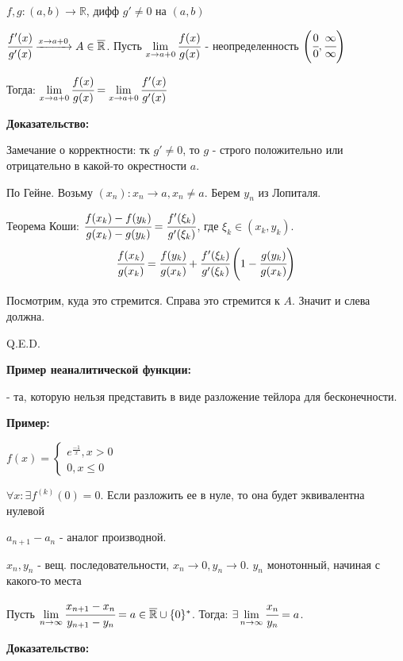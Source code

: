 
$f,g: (a,b) \rightarrow\mathbb{R}$, дифф $g'\neq 0$ на $(a,b)$

$\cfrac{f'(x)}{g'(x)} \xrightarrow{x \rightarrow a+0} A \in \overline{\mathbb{R}}$. Пусть $\lim\limits_{x\rightarrow a+0}\cfrac{f(x)}{g(x)}$ - неопределенность $\left(\cfrac{0}{0}, \cfrac{\infty}{\infty}\right)$

Тогда: $\lim\limits_{x\rightarrow a+0}\cfrac{f(x)}{g(x)}=\lim\limits_{x\rightarrow a+0} \cfrac{f'(x)}{g'(x)}$

\textbf{Доказательство:} 

Замечание о корректности: тк $g'\neq 0$, то $g$ - строго положительно или отрицательно в какой-то окрестности $a$.

По Гейне. Возьму $(x_n): x_n \rightarrow a,x_n\neq a$. Берем $y_n$ из Лопиталя. 

Теорема Коши: $\cfrac{f(x_k)-f(y_k)}{g(x_k)-g(y_k)} = \cfrac{f'(\xi_k)}{g'(\xi_k)}$, где $\xi_k \in (x_k, y_k)$.
$$\cfrac{f(x_k)}{g(x_k)} = \cfrac{f(y_k)}{g(x_k)} + \cfrac{f'(\xi_k)}{g'(\xi_k)}\left(1 - \cfrac{g(y_k)}{g(x_k)}\right)$$
    
Посмотрим, куда это стремится. Справа это стремится к $A$. Значит и слева должна.

\hfill Q.E.D.

\textbf{Пример неаналитической функции:}

 - та, которую нельзя представить в виде разложение тейлора для бесконечности.

\textbf{Пример:}

$f(x) = \begin{cases}
    e^\frac{-1}{x}, x>0\\
    0,x\leq 0
\end{cases}$

$\forall x: \exists f^{(k)}(0) = 0$. Если разложить ее в нуле, то она будет эквивалентна нулевой


$a_{n+1}-a_n$ - аналог производной.


$x_n,y_n$ - вещ. последовательности, $x_n \rightarrow 0 , y_n \rightarrow 0$. $y_n$ монотонный, начиная с какого-то места

Пусть $\lim\limits_{n\rightarrow \infty} \cfrac{x_{n+1}-x_n}{y_{n+1}-y_n} =  a\in \overline{\mathbb{R}}\cup \{0\}^*$. Тогда: $\exists \lim\limits_{n \rightarrow\infty}\cfrac{x_n}{y_n} = a$.

\textbf{Доказательство:}

